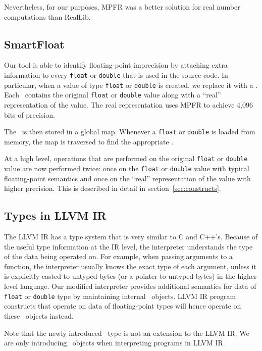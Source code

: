 Nevertheless, for our purposes, MPFR was a better solution for real number computations than RealLib.

\subsection{SmartFloat}
\label{sec:smflt}

Our tool is able to identify floating-point imprecision by attaching extra information to every \texttt{float} or \texttt{double} that is used in the source code. In particular, when a value of type \texttt{float} or \texttt{double} is created, we replace it with a \smartfloat. Each \smartfloat~contains the original \texttt{float} or \texttt{double} value along with a ``real'' representation of the value. The real representation uses MPFR to achieve 4,096 bits of precision.

The \smartfloat~is then stored in a global map. Whenever a \texttt{float} or \texttt{double} is loaded from memory, the map is traversed to find the appropriate \smartfloat.

At a high level, operations that are performed on the original \texttt{float} or \texttt{double} value are now performed twice: once on the \texttt{float} or \texttt{double} value with typical floating-point semantics and once on the ``real'' representation of the value with higher precision. This is described in detail in section~\ref{sec:constructs}.

\subsection{Types in LLVM IR}

The LLVM IR has a type system that is very similar to C and C++'s. Because of the useful type information at the IR level, the interpreter understands the type of the data being operated on. For example, when passing arguments to a function, the interpreter usually knows the exact type of each argument, unless it is explicitly casted to untyped bytes (or a pointer to untyped bytes) in the higher level language. Our modified interpreter provides additional semantics for data of \texttt{float} or \texttt{double} type by maintaining internal \smartfloat~objects. LLVM IR program constructs that operate on data of floating-point types will hence operate on these \smartfloat~objects instead.

Note that the newly introduced \smartfloat~type is not an extension to the LLVM IR. We are only introducing \smartfloat~objects when interpreting programs in LLVM IR.

